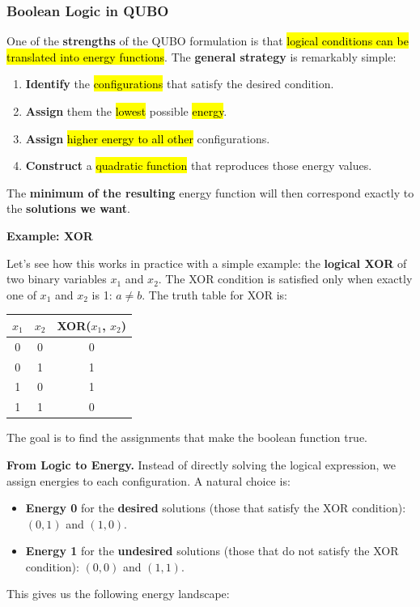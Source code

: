 \subsubsection{Boolean Logic in QUBO}\label{sec:boolean-logic-in-qubo}

One of the \textbf{strengths} of the QUBO formulation is that \hl{logical conditions can be translated into energy functions}. The \textbf{general strategy} is remarkably simple:
\begin{enumerate}
    \item \textbf{Identify} the \hl{configurations} that satisfy the desired condition.
    \item \textbf{Assign} them the \hl{lowest} possible \hl{energy}.
    \item \textbf{Assign} \hl{higher energy to all other} configurations.
    \item \textbf{Construct} a \hl{quadratic function} that reproduces those energy values.
\end{enumerate}
The \textbf{minimum of the resulting} energy function will then correspond exactly to the \textbf{solutions we want}.

\highspace
\begin{flushleft}
    \textcolor{Green3}{ \textbf{Example: XOR}}
\end{flushleft}
Let's see how this works in practice with a simple example: the \textbf{logical XOR} of two binary variables $x_1$ and $x_2$. The XOR condition is satisfied only when exactly one of $x_1$ and $x_2$ is 1: $a \ne b$. The truth table for XOR is:

\begin{table}[!htp]
    \centering
    \begin{tabular}{@{} c c | c @{}}
        \toprule
        $x_1$ & $x_2$ & XOR($x_1$, $x_2$) \\
        \midrule
        0 & 0 & 0 \\
        0 & 1 & 1 \\
        1 & 0 & 1 \\
        1 & 1 & 0 \\
        \bottomrule
    \end{tabular}
\end{table}

\noindent
The goal is to find the assignments that make the boolean function true.

\highspace
\textcolor{Green3}{ \textbf{From Logic to Energy.}} Instead of directly solving the logical expression, we assign energies to each configuration. A natural choice is:
\begin{itemize}
    \item \textbf{Energy 0} for the \textbf{desired} solutions (those that satisfy the XOR condition): $(0,1)$ and $(1,0)$.
    \item \textbf{Energy 1} for the \textbf{undesired} solutions (those that do not satisfy the XOR condition): $(0,0)$ and $(1,1)$.
\end{itemize}
This gives us the following energy landscape:

